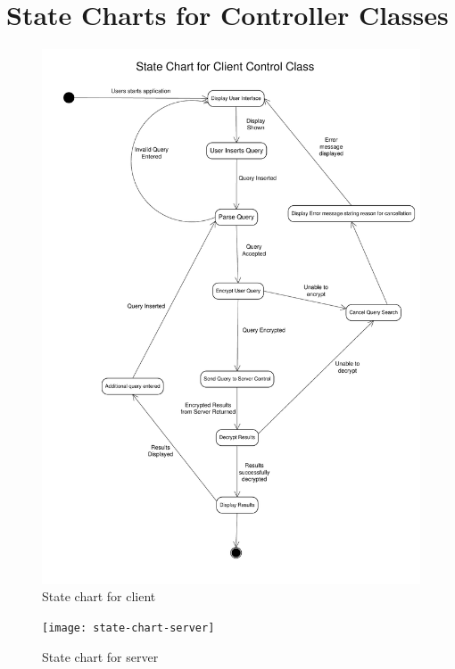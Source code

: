 \documentclass[]{article}
\begin{document}
\section{State Charts for Controller Classes}
\label{sec:state_charts_for_controller_classes}
\begin{figure}[H]
\includegraphics[width=\textwidth]{state-chart-client}
\centering
\caption{State chart for client}
\end{figure}

\begin{figure}[H]
\texttt{[image: state-chart-server]}
\centering
\caption{State chart for server}
\end{figure}
\end{document}
